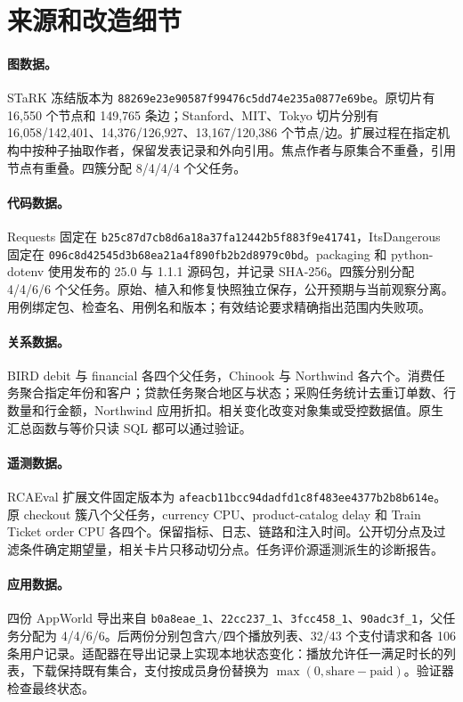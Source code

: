 \section{来源和改造细节}
\paragraph{图数据。}
STaRK 冻结版本为 \nolinkurl{88269e23e90587f99476c5dd74e235a0877e69be}。原切片有 16,550 个节点和 149,765 条边；Stanford、MIT、Tokyo 切片分别有 16,058/142,401、14,376/126,927、13,167/120,386 个节点/边。扩展过程在指定机构中按种子抽取作者，保留发表记录和外向引用。焦点作者与原集合不重叠，引用节点有重叠。四簇分配 8/4/4/4 个父任务。

\paragraph{代码数据。}
Requests 固定在 \nolinkurl{b25c87d7cb8d6a18a37fa12442b5f883f9e41741}，ItsDangerous 固定在 \nolinkurl{096c8d42545d3b68ea21a4f890fb2b2d8979c0bd}。packaging 和 python-dotenv 使用发布的 25.0 与 1.1.1 源码包，并记录 SHA-256。四簇分别分配 4/4/6/6 个父任务。原始、植入和修复快照独立保存，公开预期与当前观察分离。用例绑定包、检查名、用例名和版本；有效结论要求精确指出范围内失败项。

\paragraph{关系数据。}
BIRD debit 与 financial 各四个父任务，Chinook 与 Northwind 各六个。消费任务聚合指定年份和客户；贷款任务聚合地区与状态；采购任务统计去重订单数、行数量和行金额，Northwind 应用折扣。相关变化改变对象集或受控数据值。原生汇总函数与等价只读 SQL 都可以通过验证。

\paragraph{遥测数据。}
RCAEval 扩展文件固定版本为 \nolinkurl{afeacb11bcc94dadfd1c8f483ee4377b2b8b614e}。原 checkout 簇八个父任务，currency CPU、product-catalog delay 和 Train Ticket order CPU 各四个。保留指标、日志、链路和注入时间。公开切分点及过滤条件确定期望量，相关卡片只移动切分点。任务评价源遥测派生的诊断报告。

\paragraph{应用数据。}
四份 AppWorld 导出来自 \nolinkurl{b0a8eae_1}、\nolinkurl{22cc237_1}、\nolinkurl{3fcc458_1}、\nolinkurl{90adc3f_1}，父任务分配为 4/4/6/6。后两份分别包含六/四个播放列表、32/43 个支付请求和各 106 条用户记录。适配器在导出记录上实现本地状态变化：播放允许任一满足时长的列表，下载保持既有集合，支付按成员身份替换为 $\max(0,\mathrm{share}-\mathrm{paid})$。验证器检查最终状态。

